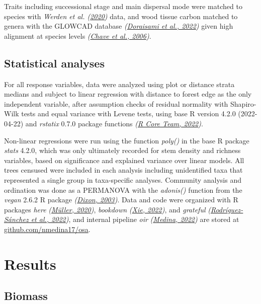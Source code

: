 \documentclass[
  12pt,
]{article}
\begin{document}
Traits including successional stage and main dispersal mode were matched to species with \emph{Werden et al. (\protect\hyperlink{ref-werden20}{2020})} data, and wood tissue carbon matched to genera with the GLOWCAD database \emph{(\protect\hyperlink{ref-doraisami22}{Doraisami et al., 2022})} given high alignment at species levels \emph{(\protect\hyperlink{ref-chave06}{Chave et al., 2006})}.

\hypertarget{statistical-analyses}{%
\subsection{Statistical analyses}\label{statistical-analyses}}

For all response variables, data were analyzed using plot or distance strata medians and subject to linear regression with distance to forest edge as the only independent variable, after assumption checks of residual normality with Shapiro-Wilk tests and equal variance with Levene tests, using base R version 4.2.0 (2022-04-22) and \emph{rstatix} 0.7.0 package functions \emph{(\protect\hyperlink{ref-base}{R Core Team, 2022})}.

Non-linear regressions were run using the function \emph{poly()} in the base R package \emph{stats} 4.2.0,
which was only ultimately recorded for stem density and richness variables, based on significance and explained variance over linear models.
All trees censused were included in each analysis including unidentified taxa that represented a single group in taxa-specific analyses.
Community analysis and ordination was done as a PERMANOVA with the \emph{adonis()} function from the \emph{vegan} 2.6.2 R package \emph{(\protect\hyperlink{ref-dixon03}{Dixon, 2003})}.
Data and code were organized with R packages \emph{here} \emph{(\protect\hyperlink{ref-here}{Müller, 2020})}, \emph{bookdown} \emph{(\protect\hyperlink{ref-bookdown2022}{Xie, 2022})}, and \emph{grateful} \emph{(\protect\hyperlink{ref-grateful}{Rodríguez-Sánchez et al., 2022})}, and internal pipeline \emph{oir} \emph{(\protect\hyperlink{ref-softwareMedina22}{Medina, 2022})} are stored at \url{github.com/nmedina17/osa}.

\hypertarget{results}{%
\section{Results}\label{results}}

\hypertarget{biomass}{%
\subsection{Biomass}\label{biomass}}
\end{document}

